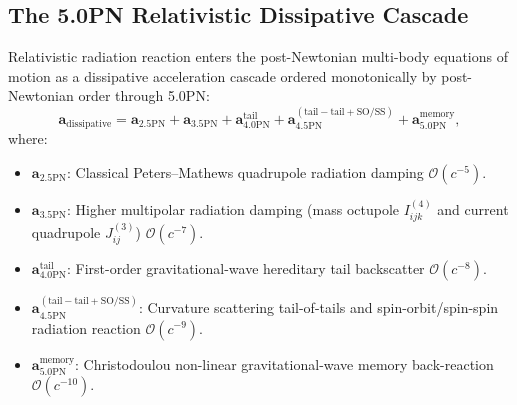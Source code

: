 \documentclass[11pt,a4paper,reqno]{article}
\theoremstyle{plain}
\theoremstyle{definition}
\theoremstyle{remark}
\numberwithin{equation}{section}
\numberwithin{table}{section}
\begin{document}
\subsection{The 5.0PN Relativistic Dissipative Cascade}
Relativistic radiation reaction enters the post-Newtonian multi-body equations of motion as a dissipative acceleration cascade ordered monotonically by post-Newtonian order through 5.0PN:
\begin{equation}
  \bm{a}_{\mathrm{dissipative}} = \bm{a}_{2.5\mathrm{PN}} + \bm{a}_{3.5\mathrm{PN}} + \bm{a}_{4.0\mathrm{PN}}^{\mathrm{tail}} + \bm{a}_{4.5\mathrm{PN}}^{(\mathrm{tail-tail} + \mathrm{SO/SS})} + \bm{a}_{5.0\mathrm{PN}}^{\mathrm{memory}},
  \label{eq:5pn_cascade_def}
\end{equation}
where:
\begin{itemize}
  \item $\bm{a}_{2.5\mathrm{PN}}$: Classical Peters--Mathews quadrupole radiation damping $\mathcal{O}(c^{-5})$.
  \item $\bm{a}_{3.5\mathrm{PN}}$: Higher multipolar radiation damping (mass octupole $I_{ijk}^{(4)}$ and current quadrupole $J_{ij}^{(3)}$) $\mathcal{O}(c^{-7})$.
  \item $\bm{a}_{4.0\mathrm{PN}}^{\mathrm{tail}}$: First-order gravitational-wave hereditary tail backscatter $\mathcal{O}(c^{-8})$.
  \item $\bm{a}_{4.5\mathrm{PN}}^{(\mathrm{tail-tail} + \mathrm{SO/SS})}$: Curvature scattering tail-of-tails and spin-orbit/spin-spin radiation reaction $\mathcal{O}(c^{-9})$.
  \item $\bm{a}_{5.0\mathrm{PN}}^{\mathrm{memory}}$: Christodoulou non-linear gravitational-wave memory back-reaction $\mathcal{O}(c^{-10})$.
\end{itemize}
\end{document}
